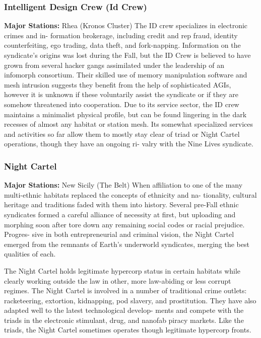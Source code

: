 \subsubsection{Intelligent Design Crew (Id Crew)}

\textbf{Major Stations:} Rhea (Kronos Cluster)
The ID crew specializes in electronic crimes and in-
formation brokerage, including credit and rep fraud, 
identity counterfeiting, ego trading, data theft, and 
fork-napping. Information on the syndicate's origins 
was lost during the Fall, but the ID Crew is believed 
to have grown from several hacker gangs assimilated 
under the leadership of an infomorph consortium. 
Their skilled use of memory manipulation software 
and mesh intrusion suggests they benefit from the 
help of sophisticated AGIs, however it is unknown 
if these voluntarily assist the syndicate or if they are 
somehow threatened into cooperation. Due to its 
service sector, the ID crew maintains a minimalist 
physical profile, but can be found lingering in the 
dark recesses of almost any habitat or station mesh. 
Its somewhat specialized services and activities so 
far allow them to mostly stay clear of triad or Night 
Cartel operations, though they have an ongoing ri-
valry with the Nine Lives syndicate.

\subsubsection{Night Cartel}

\textbf{Major Stations:} New Sicily (The Belt)
When affiliation to one of the many multi-ethnic 
habitats replaced the concepts of ethnicity and na-
tionality, cultural heritage and traditions faded with 
them into history. Several pre-Fall ethnic syndicates 
formed a careful alliance of necessity at first,  but 
uploading and morphing soon after tore down any 
remaining social codes or racial prejudice. Progres-
sive in both entrepreneurial and criminal vision, the 
Night Cartel emerged from the remnants of Earth's 
underworld syndicates, merging the best qualities 
of each.

The Night Cartel holds legitimate hypercorp status 
in certain habitats while clearly working outside 
the law in other, more law-abiding or less corrupt 
regimes. The Night Cartel is involved in a number 
of traditional crime outlets: racketeering, extortion, 
kidnapping, pod slavery, and prostitution. They have 
also adapted well to the latest technological develop-
ments and compete with the triads in the electronic 
stimulant, drug, and nanofab piracy markets. Like the 
triads, the Night Cartel sometimes operates though 
legitimate hypercorp fronts.

